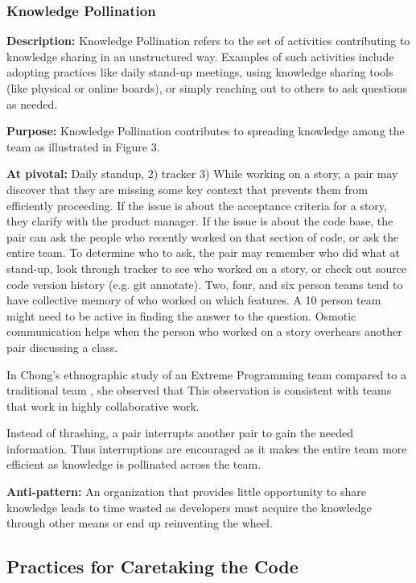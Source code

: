 \begin{table}[]
\subsubsection{Knowledge Pollination}
\textbf{Description:} Knowledge Pollination refers to the set of activities contributing to knowledge sharing in an unstructured way. Examples of such activities include adopting practices like daily stand-up meetings, using knowledge sharing tools (like physical or online boards), or simply reaching out to others to ask questions as needed.

\textbf{Purpose:} Knowledge Pollination contributes to spreading knowledge among the team as illustrated in Figure 3.

\textbf{At pivotal:} 
Daily standup, 2) tracker
3) While working on a story, a pair may discover that they are missing some key context that prevents them from efficiently proceeding. If the issue is about the acceptance criteria for a story, they clarify with the product manager. If the issue is about the code base, the pair can ask the people who recently worked on that section of code, or ask the entire team.  To determine who to ask, the pair may remember who did what at stand-up, look through tracker to see who worked on a story, or check out source code version history (e.g. git annotate). Two, four, and six  person teams tend to have collective memory of who worked on which features. A 10 person team might need to be active in finding the answer to the question. Osmotic communication helps when the person who worked on a story overhears another pair discussing a class.

In Chong's ethnographic study of an Extreme Programming team compared to a traditional team \cite{ChongNominum}, she observed that  This observation is consistent with teams that work in highly collaborative work. 

Instead of thrashing, a pair interrupts another pair to gain the needed information. Thus interruptions are encouraged as it makes the entire team more efficient as knowledge is pollinated across the team. 

\textbf{Anti-pattern:} An organization that provides little opportunity to share knowledge leads to time wasted as developers must acquire the knowledge through other means or end up reinventing the wheel.
\subsection{Practices for Caretaking the Code}

\end{table}
